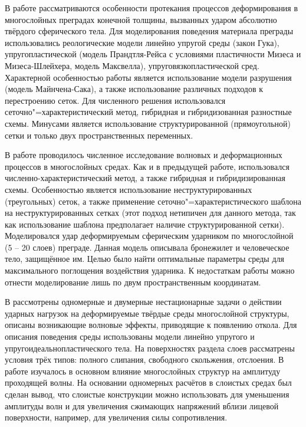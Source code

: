 В работе \cite{petrov_chelnokov} рассматриваются особенности протекания
процессов деформирования в многослойных преградах конечной толщины, вызванных
ударом абсолютно твёрдого сферического тела. Для моделирования поведения
материала преграды использовались реологические модели линейно упругой среды
(закон Гука), упругопластической (модель Прандтля-Рейса с условиями пластичности
Мизеса и Мизеса-Шлейхера, модель Максвелла), упруговязкопластической сред.
Характерной особенностью работы является использование модели разрушения (модель
Майнчена-Сака), а также использование различных подходов к перестроению сеток.
Для численного решения использовался сеточно"=характеристический метод, гибридная и гибридизованная разностные схемы. Минусами является использование структурированной (прямоугольной) сетки и только двух пространственных переменных.

В работе \cite{matyushev_petrov} проводилось численное исследование волновых и
деформационных процессов в многослойных  средах. Как и в предыдущей работе,
использовался численно-характеристический метод, а также гибридная и
гибридизированная схемы. Особенностью является использование неструктурированных
(треугольных) сеток, а также применение сеточно"=характеристического шаблона на неструктурированных сетках (этот подход нетипичен для данного метода, так как использование шаблона предполагает наличие структурированной сетки). Моделировался удар деформируемым сферическим ударником по многослойной (5 – 20 слоев) преграде. Данная модель описывала бронежилет и человеческое тело, защищённое им. Целью было найти оптимальные параметры среды для максимального поглощения воздействия ударника. К недостаткам работы можно отнести моделирование лишь по двум пространственным координатам.

В \cite{petrov_tormasov_holodov} рассмотрены одномерные и двумерные нестационарные задачи о действии ударных нагрузок на деформируемые твёрдые среды многослойной структуры, описаны возникающие волновые эффекты, приводящие к появлению откола. Для описания поведения среды использованы модели линейно упругого и упругоидеальнопластического тела. На поверхностях раздела слоев рассматрены условия трёх типов: полного слипания, свободного скольжения, отслоения. В работе изучалось в основном влияние многослойных структур на амплитуду проходящей волны. На основании одномерных расчётов в слоистых средах был сделан вывод, что слоистые конструкции можно использовать для уменьшения амплитуды волн и для увеличения сжимающих напряжений вблизи лицевой поверхности, например, для увеличения силы сопротивления.

